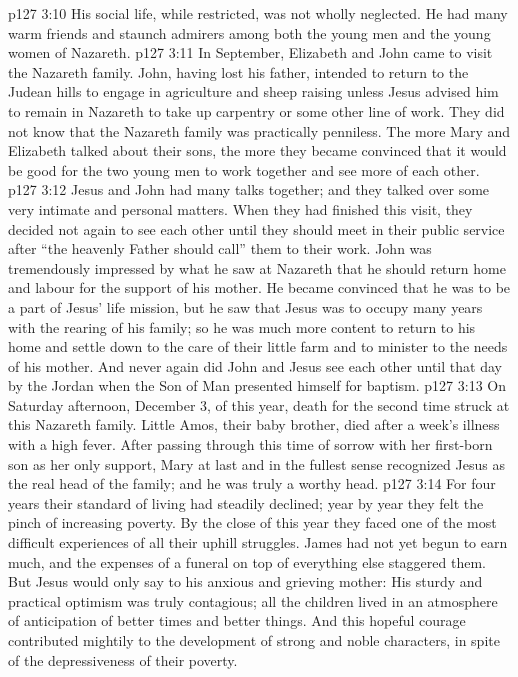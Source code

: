 \vs p127 3:10 His social life, while restricted, was not wholly neglected. He had many warm friends and staunch admirers among both the young men and the young women of Nazareth.
\vs p127 3:11 \pc In September, Elizabeth and John came to visit the Nazareth family. John, having lost his father, intended to return to the Judean hills to engage in agriculture and sheep raising unless Jesus advised him to remain in Nazareth to take up carpentry or some other line of work. They did not know that the Nazareth family was practically penniless. The more Mary and Elizabeth talked about their sons, the more they became convinced that it would be good for the two young men to work together and see more of each other.
\vs p127 3:12 Jesus and John had many talks together; and they talked over some very intimate and personal matters. When they had finished this visit, they decided not again to see each other until they should meet in their public service after “the heavenly Father should call” them to their work. John was tremendously impressed by what he saw at Nazareth that he should return home and labour for the support of his mother. He became convinced that he was to be a part of Jesus’ life mission, but he saw that Jesus was to occupy many years with the rearing of his family; so he was much more content to return to his home and settle down to the care of their little farm and to minister to the needs of his mother. And never again did John and Jesus see each other until that day by the Jordan when the Son of Man presented himself for baptism.
\vs p127 3:13 \pc On Saturday afternoon, December 3, of this year, death for the second time struck at this Nazareth family. Little Amos, their baby brother, died after a week’s illness with a high fever. After passing through this time of sorrow with her first\hyp{}born son as her only support, Mary at last and in the fullest sense recognized Jesus as the real head of the family; and he was truly a worthy head.
\vs p127 3:14 For four years their standard of living had steadily declined; year by year they felt the pinch of increasing poverty. By the close of this year they faced one of the most difficult experiences of all their uphill struggles. James had not yet begun to earn much, and the expenses of a funeral on top of everything else staggered them. But Jesus would only say to his anxious and grieving mother:  His sturdy and practical optimism was truly contagious; all the children lived in an atmosphere of anticipation of better times and better things. And this hopeful courage contributed mightily to the development of strong and noble characters, in spite of the depressiveness of their poverty.
